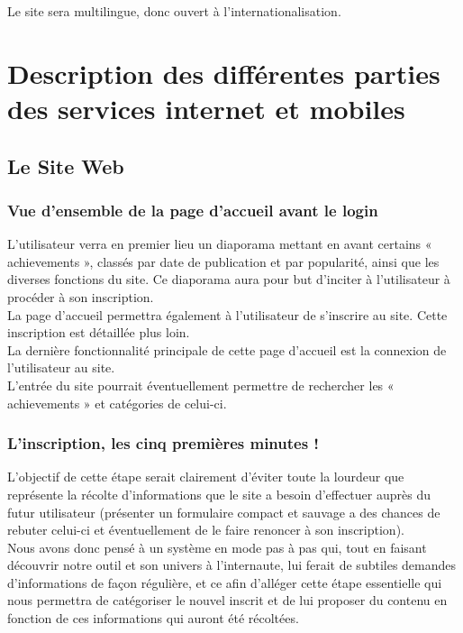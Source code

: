 \documentclass{life-fr}
\begin{document}
Le site sera multilingue, donc ouvert à l'internationalisation.


\chapter{Description des différentes parties des services internet et mobiles}

\section{Le Site Web}

\subsection{Vue d'ensemble de la page d'accueil avant le login}

L'utilisateur verra en premier lieu un diaporama mettant en avant certains « achievements », classés par date de publication et par popularité, ainsi que les diverses fonctions du site. Ce diaporama aura pour but d'inciter à l'utilisateur à procéder à son inscription.\\

La page d'accueil permettra également à l'utilisateur de s'inscrire au site. Cette inscription est détaillée plus loin.\\

La dernière fonctionnalité principale de cette page d'accueil est la connexion de l'utilisateur au site.\\

L'entrée du site pourrait éventuellement permettre de rechercher les « achievements » et catégories de celui-ci.

\newpage

\subsection{L'inscription, les cinq premières minutes !}

L'objectif de cette étape serait clairement d'éviter toute la lourdeur que représente la récolte d'informations que le site a besoin d'effectuer auprès du futur utilisateur (présenter un formulaire compact et sauvage a des chances de rebuter celui-ci et éventuellement de le faire renoncer à son inscription).\\

Nous avons donc pensé à un système en mode pas à pas qui, tout en faisant découvrir notre outil et son univers à l'internaute, lui ferait de subtiles demandes d'informations de façon régulière, et ce afin d'alléger cette étape essentielle qui nous permettra de catégoriser le nouvel inscrit et de lui proposer du contenu en fonction de ces informations qui auront été récoltées.\\
\end{document}
